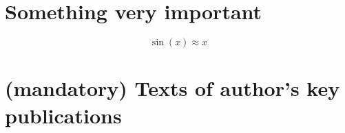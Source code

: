 \chapter{Something very important}
\label{app:details}

\[
    \sin(x) \approx x
\]


\chapter{(mandatory) Texts of author’s key publications}
\label{app:publications}



